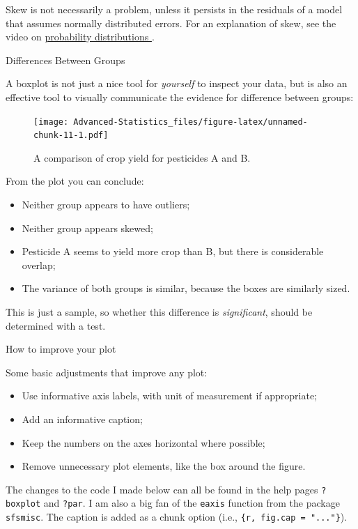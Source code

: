 \documentclass[
]{book}
\providecommand{\tightlist}{%
  \setlength{\itemsep}{0pt}\setlength{\parskip}{0pt}}
\begin{document}
Skew is not necessarily a problem, unless it persists in the residuals of a model that assumes normally distributed errors. For an explanation of skew, see the video on \href{https://youtu.be/jdfG7rKPVNk}{probability distributions }.

Differences Between Groups

A boxplot is not just a nice tool for \emph{yourself} to inspect your data, but is also an effective tool to visually communicate the evidence for difference between groups:

\begin{figure}
\centering
\texttt{[image: Advanced-Statistics\_files/figure-latex/unnamed-chunk-11-1.pdf]}
\caption{\label{fig:unnamed-chunk-11}A comparison of crop yield for pesticides A and B.}
\end{figure}

From the plot you can conclude:

\begin{itemize}
\tightlist
\item
  Neither group appears to have outliers;
\item
  Neither group appears skewed;
\item
  Pesticide A seems to yield more crop than B, but there is considerable overlap;
\item
  The variance of both groups is similar, because the boxes are similarly sized.
\end{itemize}

This is just a sample, so whether this difference is \emph{significant}, should be determined with a test.

How to improve your plot

Some basic adjustments that improve any plot:

\begin{itemize}
\tightlist
\item
  Use informative axis labels, with unit of measurement if appropriate;
\item
  Add an informative caption;
\item
  Keep the numbers on the axes horizontal where possible;
\item
  Remove unnecessary plot elements, like the box around the figure.
\end{itemize}

The changes to the code I made below can all be found in the help pages \texttt{?boxplot} and \texttt{?par}. I am also a big fan of the \texttt{eaxis} function from the package \texttt{sfsmisc}. The caption is added as a chunk option (i.e., \texttt{\textasciigrave{}\textasciigrave{}\textasciigrave{}\{r,\ fig.cap\ =\ "..."\}}).
\end{document}
